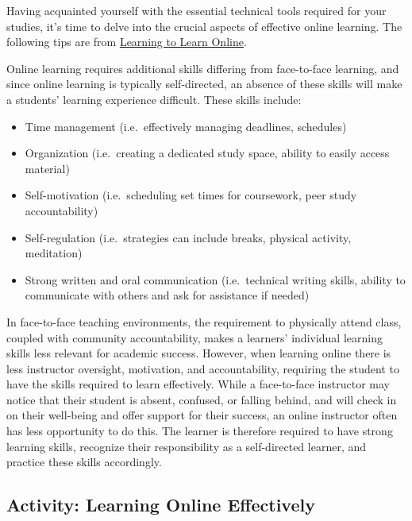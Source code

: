 \documentclass[
]{book}
\providecommand{\tightlist}{%
  \setlength{\itemsep}{0pt}\setlength{\parskip}{0pt}}
\theoremstyle{definition}
\theoremstyle{definition}
\theoremstyle{definition}
\theoremstyle{definition}
\theoremstyle{remark}
\begin{document}
Having acquainted yourself with the essential technical tools required for your studies, it's time to delve into the crucial aspects of effective online learning. The following tips are from \href{https://pressbooks.bccampus.ca/learningtolearnonlinereview/chapter/learning-skills/}{Learning to Learn Online}.

Online learning requires additional skills differing from face-to-face learning, and since online learning is typically self-directed, an absence of these skills will make a students' learning experience difficult. These skills include:

\begin{itemize}
\tightlist
\item
  Time management (i.e.~effectively managing deadlines, schedules)\\
\item
  Organization (i.e.~creating a dedicated study space, ability to easily access material)\\
\item
  Self-motivation (i.e.~scheduling set times for coursework, peer study accountability)\\
\item
  Self-regulation (i.e.~strategies can include breaks, physical activity, meditation)\\
\item
  Strong written and oral communication (i.e.~technical writing skills, ability to communicate with others and ask for assistance if needed)
\end{itemize}

In face-to-face teaching environments, the requirement to physically attend class, coupled with community accountability, makes a learners' individual learning skills less relevant for academic success. However, when learning online there is less instructor oversight, motivation, and accountability, requiring the student to have the skills required to learn effectively. While a face-to-face instructor may notice that their student is absent, confused, or falling behind, and will check in on their well-being and offer support for their success, an online instructor often has less opportunity to do this. The learner is therefore required to have strong learning skills, recognize their responsibility as a self-directed learner, and practice these skills accordingly.

\hypertarget{activity-learning-online-effectively}{%
\subsection*{Activity: Learning Online Effectively}\label{activity-learning-online-effectively}}
\end{document}
